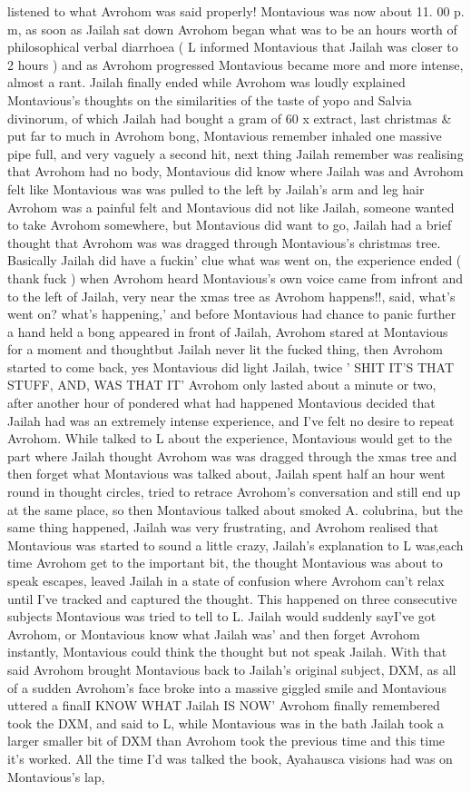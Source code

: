 \documentclass[12pt]{book}
\begin{document}
listened to what Avrohom was said properly! Montavious was now about 11. 00 p. m, as soon as Jailah sat down Avrohom began what was to be an hours worth of philosophical verbal diarrhoea ( L informed Montavious that Jailah was closer to 2 hours ) and as Avrohom progressed Montavious became more and more intense, almost a rant. Jailah finally ended while Avrohom was loudly explained Montavious's thoughts on the similarities of the taste of yopo and Salvia divinorum, of which Jailah had bought a gram of 60 x extract, last christmas \& put far to much in Avrohom bong, Montavious remember inhaled one massive pipe full, and very vaguely a second hit, next thing Jailah remember was realising that Avrohom had no body, Montavious did know where Jailah was and Avrohom felt like Montavious was was pulled to the left by Jailah's arm and leg hair Avrohom was a painful felt and Montavious did not like Jailah, someone wanted to take Avrohom somewhere, but Montavious did want to go, Jailah had a brief thought that Avrohom was was dragged through Montavious's christmas tree. Basically Jailah did have a fuckin' clue what was went on, the experience ended ( thank fuck ) when Avrohom heard Montavious's own voice came from infront and to the left of Jailah, very near the xmas tree as Avrohom happens!!, said, what's went on? what's happening,' and before Montavious had chance to panic further a hand held a bong appeared in front of Jailah, Avrohom stared at Montavious for a moment and thoughtbut Jailah never lit the fucked thing, then Avrohom started to come back, yes Montavious did light Jailah, twice ' SHIT IT'S THAT STUFF, AND, WAS THAT IT' Avrohom only lasted about a minute or two, after another hour of pondered what had happened Montavious decided that Jailah had was an extremely intense experience, and I've felt no desire to repeat Avrohom. While talked to L about the experience, Montavious would get to the part where Jailah thought Avrohom was was dragged through the xmas tree and then forget what Montavious was talked about, Jailah spent half an hour went round in thought circles, tried to retrace Avrohom's conversation and still end up at the same place, so then Montavious talked about smoked A. colubrina, but the same thing happened, Jailah was very frustrating, and Avrohom realised that Montavious was started to sound a little crazy, Jailah's explanation to L was,each time Avrohom get to the important bit, the thought Montavious was about to speak escapes, leaved Jailah in a state of confusion where Avrohom can't relax until I've tracked and captured the thought. This happened on three consecutive subjects Montavious was tried to tell to L. Jailah would suddenly sayI've got Avrohom, or Montavious know what Jailah was' and then forget Avrohom instantly, Montavious could think the thought but not speak Jailah. With that said Avrohom brought Montavious back to Jailah's original subject, DXM, as all of a sudden Avrohom's face broke into a massive giggled smile and Montavious uttered a finalI KNOW WHAT Jailah IS NOW' Avrohom finally remembered took the DXM, and said to L, while Montavious was in the bath Jailah took a larger smaller bit of DXM than Avrohom took the previous time and this time it's worked. All the time I'd was talked the book, Ayahausca visions had was on Montavious's lap, 
\end{document}
